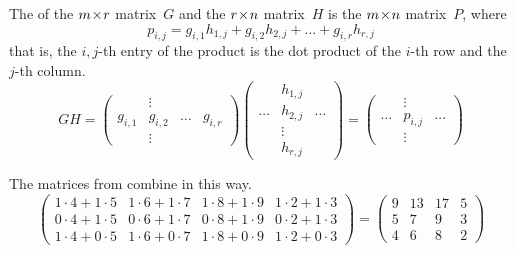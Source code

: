 \begin{definition}
\label{def:MatMult}
The %
of the \( m \! \times \! r \)
matrix~\( G \) and the \( r \! \times \! n \) matrix~\( H \) is the
\( m \! \times \! n \) matrix~\( P \), where
\begin{equation*}
  p_{i,j}
  =
  g_{i,1}h_{1,j}+g_{i,2}h_{2,j}+\dots+g_{i,r}h_{r,j}
\end{equation*}
that is, the \( i,j \)-th entry of the product is the dot product of the
\( i \)-th row and the \( j \)-th column.
\begin{equation*}
    GH=
    \begin{pmatrix}
              &\vdots                     \\
      g_{i,1} &g_{i,2} &\ldots  &g_{i,r}  \\
              &\vdots
    \end{pmatrix}
    \begin{pmatrix}
              &h_{1,j}           \\
      \ldots  &h_{2,j} &\ldots   \\
              &\vdots            \\
              &h_{r,j}
    \end{pmatrix}
  =
    \begin{pmatrix}
              &\vdots            \\
      \ldots  &p_{i,j}  &\ldots  \\
              &\vdots
    \end{pmatrix}
\end{equation*}
\end{definition}

\begin{example}
The matrices from  combine in this way.
\begin{equation*}
   \begin{pmatrix}
    1\cdot4+1\cdot5  &1\cdot6+1\cdot7  &1\cdot8+1\cdot9  &1\cdot2+1\cdot3 \\
    0\cdot4+1\cdot5  &0\cdot6+1\cdot7  &0\cdot8+1\cdot9  &0\cdot2+1\cdot3 \\
    1\cdot4+0\cdot5  &1\cdot6+0\cdot7  &1\cdot8+0\cdot9  &1\cdot2+0\cdot3
    \end{pmatrix}               
   =\begin{pmatrix}
      9  &13  &17  &5  \\
      5  &7   &9   &3  \\
      4  &6   &8   &2
    \end{pmatrix}
\end{equation*}
\end{example}

